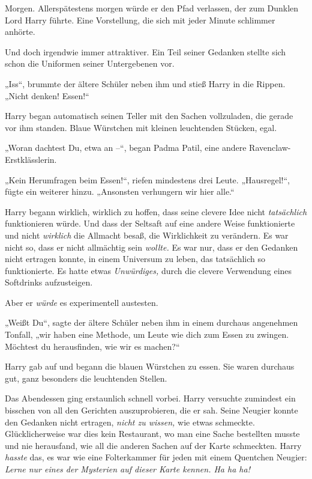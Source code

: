 Morgen. Allerspätestens morgen würde er den Pfad verlassen, der zum Dunklen Lord Harry führte. Eine Vorstellung, die sich mit jeder Minute schlimmer anhörte.

Und doch irgendwie immer attraktiver. Ein Teil seiner Gedanken stellte sich schon die Uniformen seiner Untergebenen vor.

„Iss“, brummte der ältere Schüler neben ihm und stieß Harry in die Rippen. „Nicht denken! Essen!“

Harry began automatisch seinen Teller mit den Sachen vollzuladen, die gerade vor ihm standen. Blaue Würstchen mit kleinen leuchtenden Stücken, egal.

„Woran dachtest Du, etwa an –“, began Padma Patil, eine andere Ravenclaw-Erstklässlerin.

„Kein Herumfragen beim Essen!“, riefen mindestens drei Leute. „Hausregel!“, fügte ein weiterer hinzu. „Ansonsten verhungern wir hier alle.“

Harry begann wirklich, wirklich zu hoffen, dass seine clevere Idee nicht \emph{tatsächlich} funktionieren würde. Und dass der Seltsaft auf eine andere Weise funktionierte und nicht \emph{wirklich} die Allmacht besaß, die Wirklichkeit zu verändern. Es war nicht so, dass er nicht allmächtig sein \emph{wollte.} Es war nur, dass er den Gedanken nicht ertragen konnte, in einem Universum zu leben, das tatsächlich so funktionierte. Es hatte etwas \emph{Unwürdiges,} durch die clevere Verwendung eines Softdrinks aufzusteigen.

Aber er \emph{würde} es experimentell austesten.

„Weißt Du“, sagte der ältere Schüler neben ihm in einem durchaus angenehmen Tonfall, „wir haben eine Methode, um Leute wie dich zum Essen zu zwingen. Möchtest du herausfinden, wie wir es machen?“

Harry gab auf und begann die blauen Würstchen zu essen. Sie waren durchaus gut, ganz besonders die leuchtenden Stellen.

Das Abendessen ging erstaunlich schnell vorbei. Harry versuchte zumindest ein bisschen von all den Gerichten auszuprobieren, die er sah. Seine Neugier konnte den Gedanken nicht ertragen, \emph{nicht zu wissen,} wie etwas schmeckte. Glücklicherweise war dies kein Restaurant, wo man eine Sache bestellten musste und nie herausfand, wie all die anderen Sachen auf der Karte schmeckten. Harry \emph{hasste} das, es war wie eine Folterkammer für jeden mit einem Quentchen Neugier: \emph{Lerne nur eines der Mysterien auf dieser Karte kennen. Ha ha ha!}

